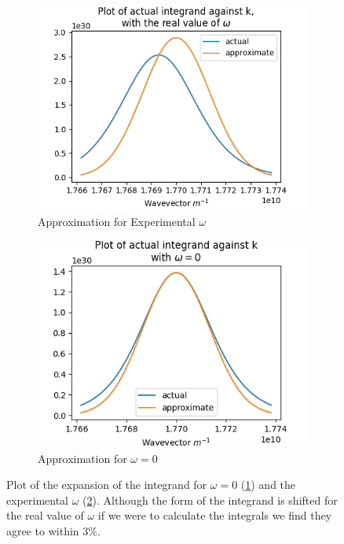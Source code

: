 \begin{figure}[htbp]
    \centering
    \begin{subfigure}{0.45\linewidth}
        \centering
        \includegraphics[width =0.9 \linewidth]{Figures/Redfield/real omega fermi k expansion.png}
        \caption{Approximation for Experimental \(\omega \)
        }\label{sub@fig:omega zero expansion}
    \end{subfigure}
    \hfill
    \begin{subfigure}{0.45\linewidth}
        \centering
        \includegraphics[width = 0.9\linewidth]{Figures/Redfield/zero omega fermi k expansion.png}
        \caption{Approximation for \(\omega = 0\)
        }\label{sub@fig:omega not zero expansion}
    \end{subfigure}
    \caption{
        Plot of the expansion of
        the integrand for \(\omega = 0\)
        (\cref{sub@fig:omega zero expansion})
        and the experimental \(\omega \)
        (\cref{sub@fig:omega not zero expansion}).
        Although the form of the
        integrand is shifted for the
        real value of \(\omega \)
        if we were to calculate
        the integrals we find
        they agree
        to within \(3\% \).
    }\label{fig:expansion about kf}
\end{figure}
